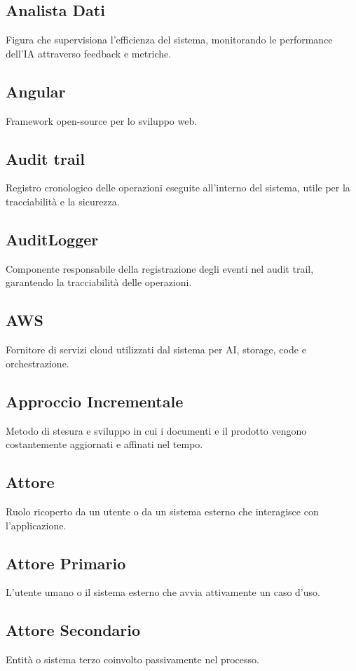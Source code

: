 \documentclass[a4paper,12pt]{article}
\begin{document}
\subsection{Analista Dati}
Figura che supervisiona l'efficienza del sistema, monitorando le performance dell'IA attraverso feedback e metriche.

\subsection{Angular}
Framework open-source per lo sviluppo web.

\subsection{Audit trail}
Registro cronologico delle operazioni eseguite all'interno del sistema, utile per la tracciabilità e la sicurezza.

\subsection{AuditLogger}
Componente responsabile della registrazione degli eventi nel audit trail, garantendo la tracciabilità delle operazioni.

\subsection{AWS}
Fornitore di servizi cloud utilizzati dal sistema per AI, storage, code e orchestrazione.

\subsection{Approccio Incrementale}
Metodo di stesura e sviluppo in cui i documenti e il prodotto vengono costantemente aggiornati e affinati nel tempo.

\subsection{Attore}
Ruolo ricoperto da un utente o da un sistema esterno che interagisce con l'applicazione.

\subsection{Attore Primario}
L'utente umano o il sistema esterno che avvia attivamente un caso d'uso.

\subsection{Attore Secondario}
Entità o sistema terzo coinvolto passivamente nel processo.
\end{document}
